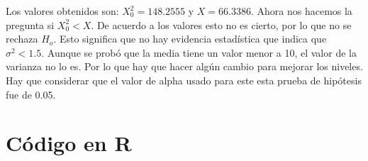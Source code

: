 \documentclass[12pt,a4paper]{article}
\begin{document}
\begin{enumerate}
\begin{enumerate}
\begin{enumerate}
      Los valores obtenidos son: \(X^2_0=148.2555\) y \(X=66.3386\). Ahora nos hacemos la pregunta si \(X^2_0<X\). De acuerdo a los valores esto no es cierto, por lo que no se rechaza \(H_o\). Esto significa que no hay evidencia estadística que indica que \(\sigma^2<1.5\). Aunque se probó que la media tiene un valor menor a 10, el valor de la varianza no lo es. Por lo que hay que hacer algún cambio para mejorar los niveles. Hay que considerar que el valor de alpha usado para este esta prueba de hipótesis fue de 0.05.
    \end{enumerate}
  \end{enumerate}
\end{enumerate}

\newpage
\section*{C\'odigo en R}
\end{document}
